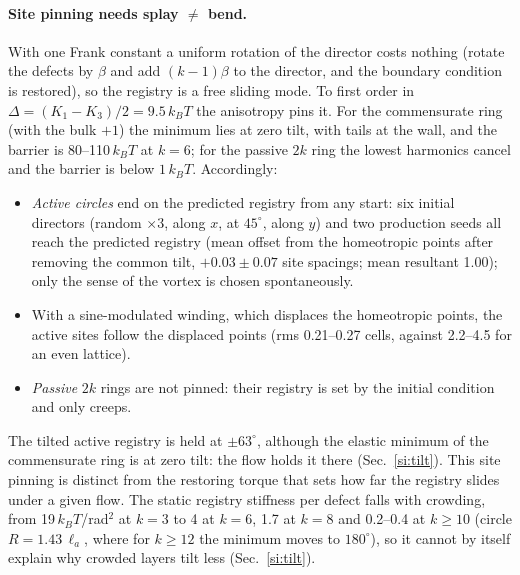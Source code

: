 \documentclass[aps,prl,onecolumn,superscriptaddress,amsmath,amssymb,nofootinbib]{revtex4-2}
\newcommand{\la}{\ell_a}
\newcommand{\kT}{k_BT}
\begin{document}
\paragraph{Site pinning needs splay $\neq$ bend.} With one Frank constant a uniform rotation of the director costs nothing (rotate the defects by $\beta$ and add $(k-1)\beta$
to the director, and the boundary condition is restored), so the registry is a free sliding mode. To first order in $\Delta=(K_1-K_3)/2=9.5\,\kT$ the anisotropy pins
it. For the commensurate ring (with the bulk $+1$) the minimum lies at zero tilt, with tails at the wall, and the barrier is 80--110\,$\kT$ at $k=6$; for the passive $2k$
ring the lowest harmonics cancel and the barrier is below $1\,\kT$. Accordingly:
\begin{itemize}
\item \emph{Active circles} end on the predicted registry from any start: six initial directors (random $\times3$, along $x$, at $45^\circ$, along $y$) and two production
seeds all reach the predicted registry (mean offset from the homeotropic points after removing the common tilt, $+0.03\pm0.07$ site spacings; mean resultant 1.00); only the sense of the vortex is chosen spontaneously.
\item With a sine-modulated winding, which displaces the homeotropic points, the active sites follow the displaced points (rms 0.21--0.27 cells, against 2.2--4.5 for an even
lattice).
\item \emph{Passive} $2k$ rings are not pinned: their registry is set by the initial condition and only creeps.
\end{itemize}
The tilted active registry is held at $\pm63^\circ$, although the elastic minimum of the commensurate ring is at zero tilt: the flow holds it there (Sec.~\ref{si:tilt}). This
site pinning is distinct from the restoring torque that sets how far the registry slides under a given flow. The static registry stiffness per defect falls with crowding,
from 19\,$\kT$/rad$^2$ at $k=3$ to 4 at $k=6$, 1.7 at $k=8$ and 0.2--0.4 at $k\geq10$ (circle $R=1.43\,\la$, where for $k\geq12$ the minimum moves to $180^\circ$), so it
cannot by itself explain why crowded layers tilt less (Sec.~\ref{si:tilt}).
\end{document}
